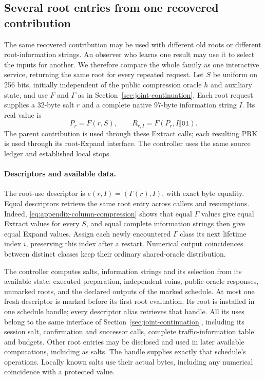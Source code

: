 \subsection{Several root entries from one recovered contribution}
\label{sec:multiple-root-entry}

The same recovered contribution may be used with different old roots
or different root-information strings. An observer who learns one
result may use it to select the inputs for another. We therefore compare
the whole family as one interactive service, returning the same root
for every repeated request.
Let $S$ be uniform on 256 bits, initially independent of the public compression
oracle $h$ and auxiliary state, and use $F$ and $\Gamma$ as in
Section~\ref{sec:joint-continuation}. Each root request supplies a 32-byte
salt $r$ and a complete native 97-byte information string $I$. Its real value is
\[
 P_r=F(r,S),\qquad R_{r,I}=F(P_r,I\Vert\mathtt{01}).
\]
The parent contribution is used through these Extract calls; each resulting
PRK is used through its root-Expand interface. The controller uses the
same source ledger and established local stops.

\paragraph{Descriptors and available data.}
The root-use descriptor is
$e(r,I)=(\Gamma(r),I)$, with exact byte equality. Equal descriptors retrieve
the same root entry across callers and resumptions. Indeed,
\eqref{eq:appendix-column-compression} shows that equal $\Gamma$ values give
equal Extract values for every $S$, and equal complete information strings
then give equal Expand values. Assign each newly encountered $\Gamma$ class
its next lifetime index $i$, preserving this index after a restart.
Numerical output coincidences between distinct classes keep their ordinary
shared-oracle distribution.

The controller computes salts, information strings and its selection from
its available state: executed preparation, independent coins, public-oracle
responses, unmarked roots, and the declared outputs of the marked schedule.
At most one fresh descriptor is marked before its first root evaluation.
Its root is installed in one schedule handle; every descriptor alias
retrieves that handle. All its uses belong to the same interface of
Section~\ref{sec:joint-continuation}, including its session salt, confirmation
and successor calls, complete traffic-information table and budgets. Other
root entries may be disclosed and used in later available computations,
including as salts. The handle supplies exactly that schedule's
operations. Locally known salts use their actual bytes, including any
numerical coincidence with a protected value.

